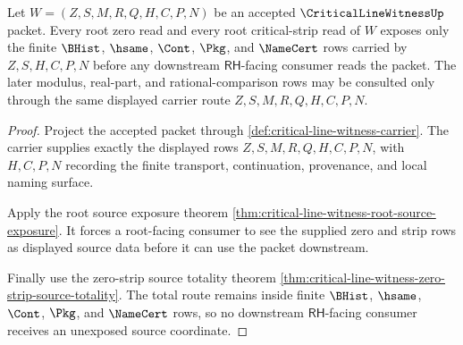 \begin{theorem}
\label{thm:critical-line-witness-root-finite-strip-route}
Let $W=(Z,S,M,R,Q,H,C,P,N)$ be an accepted $\CriticalLineWitnessUp$ packet. Every root zero read and every root critical-strip read of $W$ exposes only the finite $\BHist$, $\hsame$, $\Cont$, $\Pkg$, and $\NameCert$ rows carried by $Z,S,H,C,P,N$ before any downstream $\mathsf{RH}$-facing consumer reads the packet. The later modulus, real-part, and rational-comparison rows may be consulted only through the same displayed carrier route $Z,S,M,R,Q,H,C,P,N$.
\end{theorem}
\begin{proof}
Project the accepted packet through \autoref{def:critical-line-witness-carrier}. The carrier supplies exactly the displayed rows $Z,S,M,R,Q,H,C,P,N$, with $H,C,P,N$ recording the finite transport, continuation, provenance, and local naming surface.

Apply the root source exposure theorem \autoref{thm:critical-line-witness-root-source-exposure}. It forces a root-facing consumer to see the supplied zero and strip rows as displayed source data before it can use the packet downstream.

Finally use the zero-strip source totality theorem \autoref{thm:critical-line-witness-zero-strip-source-totality}. The total route remains inside finite $\BHist$, $\hsame$, $\Cont$, $\Pkg$, and $\NameCert$ rows, so no downstream $\mathsf{RH}$-facing consumer receives an unexposed source coordinate.
\end{proof}

